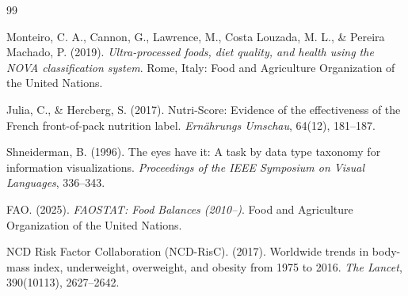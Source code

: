 \documentclass[10pt, a4paper]{article}
\begin{document}
\begin{thebibliography}{99}
\small

Monteiro, C. A., Cannon, G., Lawrence, M., Costa Louzada, M. L., \& Pereira Machado, P. (2019). \emph{Ultra-processed foods, diet quality, and health using the NOVA classification system}. Rome, Italy: Food and Agriculture Organization of the United Nations.

Julia, C., \& Hercberg, S. (2017). Nutri-Score: Evidence of the effectiveness of the French front-of-pack nutrition label. \emph{Ernährungs Umschau}, 64(12), 181--187.

Shneiderman, B. (1996). The eyes have it: A task by data type taxonomy for information visualizations. \emph{Proceedings of the IEEE Symposium on Visual Languages}, 336--343.

FAO. (2025). \emph{FAOSTAT: Food Balances (2010--)}. Food and Agriculture Organization of the United Nations.

NCD Risk Factor Collaboration (NCD-RisC). (2017). Worldwide trends in body-mass index, underweight, overweight, and obesity from 1975 to 2016. \emph{The Lancet}, 390(10113), 2627--2642.

\end{thebibliography}
\end{document}
